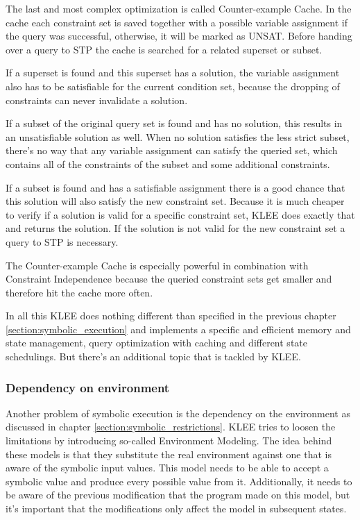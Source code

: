 The last and most complex optimization is called Counter-example Cache. In the cache each constraint set is saved together with a possible variable assignment if the query was successful, otherwise, it will be marked as UNSAT. Before handing over a query to STP the cache is searched for a related superset or subset.

If a superset is found and this superset has a solution, the variable assignment also has to be satisfiable for the current condition set, because the dropping of constraints can never invalidate a solution.

If a subset of the original query set is found and has no solution, this results in an unsatisfiable solution as well. When no solution satisfies the less strict subset, there's no way that any variable assignment can satisfy the queried set, which contains all of the constraints of the subset and some additional constraints.

If a subset is found and has a satisfiable assignment there is a good chance that this solution will also satisfy the new constraint set. Because it is much cheaper to verify if a solution is valid for a specific constraint set, KLEE does exactly that and returns the solution. If the solution is not valid for the new constraint set a query to STP is necessary.

The Counter-example Cache is especially powerful in combination with Constraint Independence because the queried constraint sets get smaller and therefore hit the cache more often.

In all this KLEE does nothing different than specified in the previous chapter \ref{section:symbolic_execution} and implements a specific and efficient memory and state management, query optimization with caching and different state schedulings. But there's an additional topic that is tackled by KLEE.
\subsubsection{Dependency on environment}
Another problem of symbolic execution is the dependency on the environment as discussed in chapter \ref{section:symbolic_restrictions}. KLEE tries to loosen the limitations by introducing so-called Environment Modeling. The idea behind these models is that they substitute the real environment against one that is aware of the symbolic input values. 
This model needs to be able to accept a symbolic value and produce every possible value from it. Additionally, it needs to be aware of the previous modification that the program made on this model, but it's important that the modifications only affect the model in subsequent states. 

